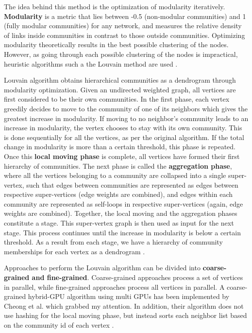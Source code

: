 The idea behind this method is the optimization of modularity iteratively. \textbf{Modularity} is a metric that lies between -0.5 (non-modular communities) and 1 (fully modular communities) for any network, and measures the relative density of links inside communities in contrast to those outside communities. Optimizing modularity theoretically results in the best possible clustering of the nodes. However, as going through each possible clustering of the nodes is impractical, heuristic algorithms such a the Louvain method are used \cite{com-lancichinetti09}.

Louvain algorithm obtains hierarchical communities as a dendrogram through modularity optimization. Given an undirected weighted graph, all vertices are first considered to be their own communities. In the first phase, each vertex greedily decides to move to the community of one of its neighbors which gives the greatest increase in modularity. If moving to no neighbor's community leads to an increase in modularity, the vertex chooses to stay with its own community. This is done sequentially for all the vertices, as per the original algorithm. If the total change in modularity is more than a certain threshold, this phase is repeated. Once this \textbf{local moving phase} is complete, all vertices have formed their first hierarchy of communities. The next phase is called the \textbf{aggregation phase}, where all the vertices belonging to a community are collapsed into a single super-vertex, such that edges between communities are represented as edges between respective super-vertices (edge weights are combined), and edges within each community are represented as self-loops in respective super-vertices (again, edge weights are combined). Together, the local moving and the aggregation phases constitute a stage. This super-vertex graph is then used as input for the next stage. This process continues until the increase in modularity is below a certain threshold. As a result from each stage, we have a hierarchy of community memberships for each vertex as a dendrogram \cite{com-leskovec21}.

Approaches to perform the Louvain algorithm can be divided into \textbf{coarse-grained and fine-grained}. Coarse-grained approaches process a set of vertices in parallel, while fine-grained approaches process all vertices in parallel. A coarse-grained hybrid-GPU algorithm using multi GPUs has been implemented by Cheong et al. \cite{com-cheong13} which grabbed my attention. In addition, their algorithm does not use hashing for the local moving phase, but instead sorts each neighbor list based on the community id of each vertex \cite{com-naim17}.

